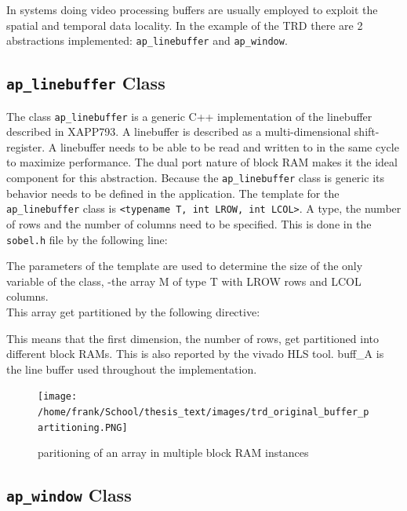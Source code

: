In systems doing video processing buffers are usually employed to exploit the spatial and temporal data locality. In the example of the TRD there are 2 abstractions implemented: \texttt{ap\_linebuffer} and \texttt{ap\_window}.

\subsection{\texttt{ap\_linebuffer} Class}

The class \texttt{ap\_linebuffer} is a generic C++ implementation of the linebuffer described in XAPP793. A linebuffer is described as a multi-dimensional shift-register. A linebuffer needs to be able to be read and written to in the same cycle to maximize performance. The dual port nature of block RAM makes it the ideal component for this abstraction.
Because the \texttt{ap\_linebuffer} class is generic its behavior needs to be defined in the application. The template for the \texttt{ap\_linebuffer} class is \texttt{<typename T, int LROW, int LCOL>}. A type, the number of rows and the number of columns need to be specified. This is done in the \texttt{sobel.h} file by the following line:




The parameters of the template are used to determine the size of the only variable of the class, -the array M of type T with LROW rows and LCOL columns.\\
This array get partitioned by the following directive:



This means that the first dimension, the number of rows, get partitioned into different block RAMs. This is also reported by the vivado HLS tool. buff\_A is the line buffer used throughout the implementation.\\

\medskip

\begin{figure}[h]
\centering
\texttt{[image: /home/frank/School/thesis\_text/images/trd\_original\_buffer\_partitioning.PNG]} 
\caption{paritioning of an array in multiple block RAM instances}
\end{figure}


\subsection{\texttt{ap\_window} Class}

